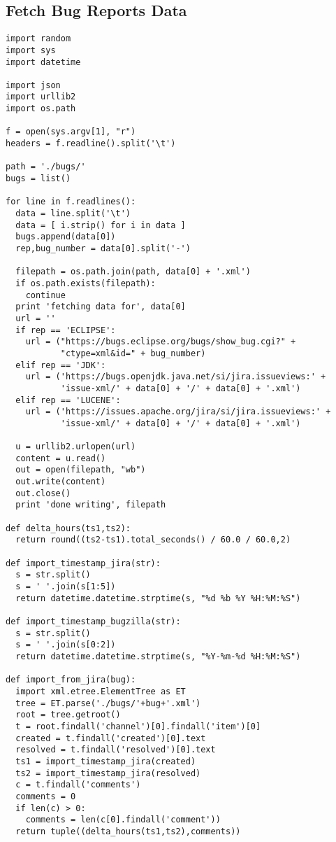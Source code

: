 \begin{appendices}
\chapter{Fetch Bug Reports Data}

\noindent
\begin{verbatim}
import random
import sys
import datetime

import json
import urllib2
import os.path

f = open(sys.argv[1], "r")
headers = f.readline().split('\t')

path = './bugs/'
bugs = list()

for line in f.readlines():
  data = line.split('\t')
  data = [ i.strip() for i in data ]
  bugs.append(data[0])
  rep,bug_number = data[0].split('-')

  filepath = os.path.join(path, data[0] + '.xml')
  if os.path.exists(filepath):
    continue
  print 'fetching data for', data[0]
  url = ''
  if rep == 'ECLIPSE':
    url = ("https://bugs.eclipse.org/bugs/show_bug.cgi?" +
           "ctype=xml&id=" + bug_number)
  elif rep == 'JDK':
    url = ('https://bugs.openjdk.java.net/si/jira.issueviews:' +
           'issue-xml/' + data[0] + '/' + data[0] + '.xml')
  elif rep == 'LUCENE':
    url = ('https://issues.apache.org/jira/si/jira.issueviews:' +
           'issue-xml/' + data[0] + '/' + data[0] + '.xml')

  u = urllib2.urlopen(url)
  content = u.read()
  out = open(filepath, "wb")
  out.write(content)
  out.close()
  print 'done writing', filepath

def delta_hours(ts1,ts2):
  return round((ts2-ts1).total_seconds() / 60.0 / 60.0,2)

def import_timestamp_jira(str):
  s = str.split()
  s = ' '.join(s[1:5])
  return datetime.datetime.strptime(s, "%d %b %Y %H:%M:%S")

def import_timestamp_bugzilla(str):
  s = str.split()
  s = ' '.join(s[0:2])
  return datetime.datetime.strptime(s, "%Y-%m-%d %H:%M:%S")

def import_from_jira(bug):
  import xml.etree.ElementTree as ET
  tree = ET.parse('./bugs/'+bug+'.xml')
  root = tree.getroot()
  t = root.findall('channel')[0].findall('item')[0]
  created = t.findall('created')[0].text
  resolved = t.findall('resolved')[0].text
  ts1 = import_timestamp_jira(created)
  ts2 = import_timestamp_jira(resolved)
  c = t.findall('comments')
  comments = 0
  if len(c) > 0:
    comments = len(c[0].findall('comment'))
  return tuple((delta_hours(ts1,ts2),comments))


\end{verbatim}
\end{appendices}
